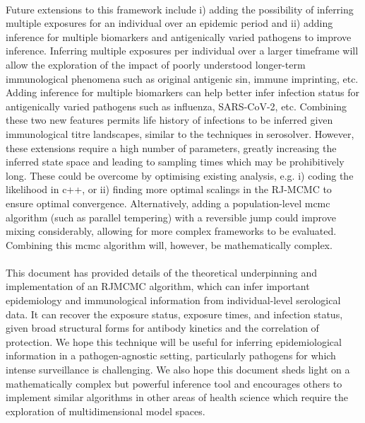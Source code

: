 \paragraph{}Future extensions to this framework include i) adding the possibility of inferring multiple exposures for an individual over an epidemic period and ii) adding inference for multiple biomarkers and antigenically varied pathogens to improve inference. Inferring multiple exposures per individual over a larger timeframe will allow the exploration of the impact of poorly understood longer-term immunological phenomena such as original antigenic sin, immune imprinting, etc. Adding inference for multiple biomarkers can help better infer infection status for antigenically varied pathogens such as influenza, SARS-CoV-2, etc. Combining these two new features permits life history of infections to be inferred given immunological titre landscapes, similar to the techniques in serosolver\cite{Hay2020-pr}. However, these extensions require a high number of parameters, greatly increasing the inferred state space and leading to sampling times which may be prohibitively long. These could be overcome by optimising existing analysis, e.g. i) coding the likelihood in c++, or ii) finding more optimal scalings in the RJ-MCMC to ensure optimal convergence. Alternatively, adding a population-level mcmc algorithm (such as parallel tempering) with a reversible jump could improve mixing considerably, allowing for more complex frameworks to be evaluated. Combining this mcmc algorithm will, however, be mathematically complex.


\paragraph{}This document has provided details of the theoretical underpinning and implementation of an RJMCMC algorithm, which can infer important epidemiology and immunological information from individual-level serological data. It can recover the exposure status, exposure times, and infection status, given broad structural forms for antibody kinetics and the correlation of protection. We hope this technique will be useful for inferring epidemiological information in a pathogen-agnostic setting, particularly pathogens for which intense surveillance is challenging. We also hope this document sheds light on a mathematically complex but powerful inference tool and encourages others to implement similar algorithms in other areas of health science which require the exploration of multidimensional model spaces. 
